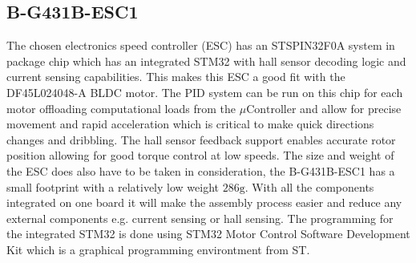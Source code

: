 \documentclass[a4paper,12pt]{article}
\begin{document}
  \subsection*{B-G431B-ESC1} The chosen electronics speed controller
  (ESC) has an STSPIN32F0A system in package chip which has an
  integrated STM32 with hall sensor decoding logic and current sensing
  capabilities. This makes this ESC a good fit with the DF45L024048-A
  BLDC motor. The PID system can be run on this chip for each motor
  offloading computational loads from the $\mu\text{Controller}$ and
  allow for precise movement and rapid acceleration which is critical to
  make quick directions changes and dribbling. The hall sensor feedback
  support enables accurate rotor position allowing for good torque
  control at low speeds. The size and weight of the ESC does also have
  to be taken in consideration, the B-G431B-ESC1 has a small footprint
  with a relatively low weight $286\text{g}$. With all the components
  integrated on one board it will make the assembly process easier and
  reduce any external components e.g. current sensing or hall sensing.
  The programming for the integrated STM32 is done using STM32 Motor
  Control Software Development Kit which is a graphical programming
  environtment from ST.
\end{document}
